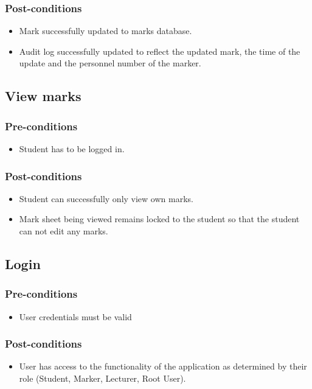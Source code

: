 \subsubsection{Post-conditions}
\begin{itemize}
\item Mark successfully updated to marks database.
\item Audit log successfully updated to reflect the updated mark, the time of the update and the personnel number of the marker.
\end{itemize}


\subsection{View marks}
\subsubsection{Pre-conditions}
\begin{itemize}
\item Student has to be logged in.
\end{itemize}
\subsubsection{Post-conditions}
\begin{itemize}
\item Student can successfully only view own marks.
\item Mark sheet being viewed remains locked to the student so that the student can not edit any marks.
\end{itemize}

\subsection{Login}
\subsubsection{Pre-conditions}
\begin{itemize}
\item User credentials must be valid
\end{itemize}
\subsubsection{Post-conditions}
\begin{itemize}
\item User has access to the functionality of the application as determined by their role (Student, Marker, Lecturer, Root User).
\end{itemize}

